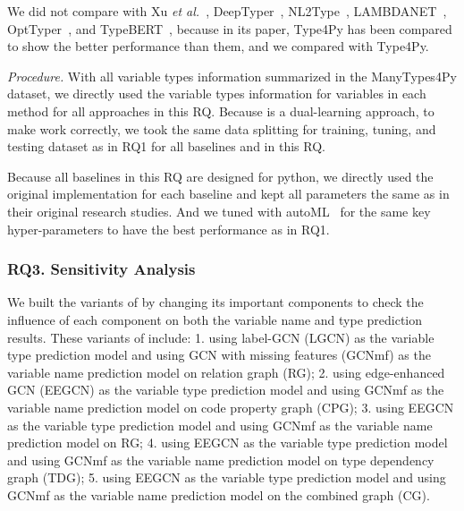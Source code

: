 
We did not compare with Xu {\em et al.}~\cite{xu-fse16},
DeepTyper~\cite{DeepTyper-fse18}, NL2Type~\cite{nl2type-icse19},
LAMBDANET~\cite{LambdaNet-iclr20}, OptTyper~\cite{optyper20}, and
TypeBERT~\cite{typeBERT-fse21}, because in its paper, Type4Py has been
compared to show the better performance than them, and we compared
with Type4Py.


\textit{Procedure.} With all variable types information summarized in the ManyTypes4Py dataset, we directly used the variable types information for variables in each method for all approaches in this RQ. Because {\tool} is a dual-learning approach, to make {\tool} work correctly, we took the same data splitting for training, tuning, and testing dataset as in RQ1 for all baselines and {\tool} in this RQ.

Because all baselines in this RQ are designed for python, we directly used the original implementation for each baseline and kept all parameters the same as in their original research studies. And we tuned {\tool} with autoML~\cite{NNI} for the same key hyper-parameters to have the best performance as in RQ1.

\subsubsection{RQ3. Sensitivity Analysis}

We built the variants of {\tool} by changing its important components to check the influence of each component on both the variable name and type prediction results. These variants of {\tool} include: 1. using label-GCN (LGCN) as the variable type prediction model and using GCN with missing features (GCNmf) as the variable name prediction model on relation graph (RG); 2. using edge-enhanced GCN (EEGCN) as the variable type prediction model and using GCNmf as the variable name prediction model on code property graph (CPG); 3. using EEGCN as the variable type prediction model and using GCNmf as the variable name prediction model on RG; 4. using EEGCN as the variable type prediction model and using GCNmf as the variable name prediction model on type dependency graph (TDG); 5. using EEGCN as the variable type prediction model and using GCNmf as the variable name prediction model on the combined graph (CG).

